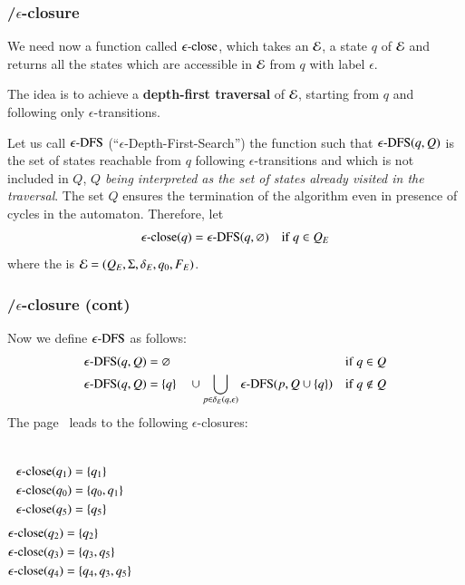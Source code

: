 %
\begin{frame}
\frametitle{\eNFA{}/\(\epsilon\)-closure}

We need now a function called \textbf{\(\epsilon\text{-close}\)}, which takes an
\eNFA \(\cal E\), a state \(q\) of \(\cal E\) and returns all the
states which are accessible in \(\cal E\) from \(q\) with label
\(\epsilon\).

\bigskip

The idea is to achieve a \textbf{depth-first traversal} of \(\cal E\),
starting from \(q\) and following only \(\epsilon\)-transitions.

\bigskip

Let us call \(\epsilon\text{-DFS}\) (``\(\epsilon\)-Depth-First-Search'') the
function such that \(\epsilon\text{-DFS}(q, Q)\) is the set of states reachable from
\(q\) following \(\epsilon\)-transitions and which is not included in
\(Q\), \emph{\(Q\) being interpreted as the set of states already
  visited in the traversal}. The set \(Q\) ensures the termination of
the algorithm even in presence of cycles in the automaton. Therefore,
let
\[
\epsilon\text{-close} (q) = \epsilon\text{-DFS} (q, \varnothing) \quad \text{if} \; q \in Q_E
\]
where the \eNFA is \({\cal E} = (Q_E, \Sigma, \delta_E, q_0, F_E)\).

\end{frame}

%
\begin{frame}
\frametitle{\eNFA{}/\(\epsilon\)-closure (cont)}

Now we define \(\epsilon\text{-DFS}\) as follows:
\begin{align}
   \epsilon\text{-DFS} (q, Q)
&= \varnothing
& \text{if} \; q \in Q \label{eDFS_1}\\
  \epsilon\text{-DFS} (q, Q)
&= \{q\} \quad \cup \bigcup_{p \in \delta_E(q,\epsilon)}{\epsilon\text{-DFS} (p, Q
    \cup \{q\})}
& \text{if} \; q \not\in Q \label{eDFS_2}
\end{align}
The \eNFA page~\pageref{enfa_num} leads to the
following \(\epsilon\)-closures:

\bigskip

\begin{columns}
    \begin{align*}
      \epsilon\text{-close} (q_1) &= \{q_1\}\\
      \epsilon\text{-close} (q_0) &= \{q_0, q_1\}\\
      \epsilon\text{-close} (q_5) &= \{q_5\}
    \end{align*}
  \begin{align*}
    \epsilon\text{-close} (q_2) &= \{q_2\}\\
    \epsilon\text{-close} (q_3) &= \{q_3, q_5\}\\
    \epsilon\text{-close} (q_4) &= \{q_4, q_3, q_5\}
  \end{align*}
\end{columns}

\end{frame}

